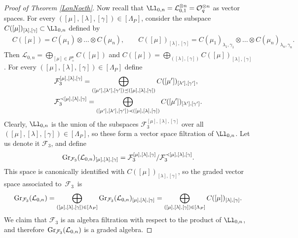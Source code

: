 \begin{proof}[Proof of Theorem \ref{LonNoeth}]
Now recall that $\Ll_{0,n} = {\mathcal L}_{0,1}^{\otimes n} = {\mathcal O}_q^{\otimes n}$ as vector spaces. For every $([\mu],[\lambda],[\gamma])\in[\Lambda_P]$, consider the subspace $C([\mu])_{[\lambda],[\gamma]}\subset \Ll_{0,n}$ defined by
\begin{align*}
&C([\mu]) =C(\mu_1)\otimes \dots \otimes C(\mu_n),\qquad
C([\mu])_{[\lambda],[\gamma]}=C(\mu_1)_{\lambda_1,\gamma_1}\otimes \dots \otimes C(\mu_n)_{\lambda_n,\gamma_n}.
\end{align*}
Then $ {\mathcal L}_{0,n}=\bigoplus_{[\mu]\in P_+^n} C({[\mu]})$ and $ C({[\mu]})=\bigoplus_{([\lambda],[\gamma])} C([\mu])_{[\lambda],[\gamma]}$. For every
$([\mu],[\lambda],[\gamma])\in [\Lambda_P]$ define
\begin{align}
&{\mathcal F}_3^{[\mu],[\lambda],[\gamma]} =\bigoplus_{([\mu'],[\lambda'],[\gamma'])\preceq ([\mu],[\lambda],[\gamma])} C([\mu'])_{[\lambda'],[\gamma']},\label{F2grad}\\
&{\mathcal F}_3^{\prec [\mu],[\lambda],[\gamma]} =\bigoplus_{([\mu'],[\lambda'],[\gamma'])\prec ([\mu],[\lambda],[\gamma])} C([\mu'])_{[\lambda'],[\gamma']}.\notag
\end{align}
Clearly, $\Ll_{0,n}$ is the union of the subspaces ${\mathcal F}_3^{[\mu],[\lambda],[\gamma]}$ over all $([\mu],[\lambda],[\gamma])\in [\Lambda_P]$, so these form a vector space filtration of $\Ll_{0,n}$. Let us denote it ${\mathcal F}_3$, and define
\[{\rm Gr}_{{\mathcal F}_3}({\mathcal L}_{0,n})_{[\mu],[\lambda],[\gamma]} = {\mathcal F}_3^{[\mu],[\lambda],[\gamma]}/{\mathcal F}_3^{\prec [\mu],[\lambda],[\gamma]}.\]
This space is canonically identified with $C({[\mu]})_{[\lambda],[\gamma]}$, so the graded vector space associated to~$\mathcal{F}_3$~is%
\begin{equation}\label{decompgrad}
{\rm Gr}_{{\mathcal F}_3}({\mathcal L}_{0,n}) = \bigoplus_{([\mu],[\lambda],[\gamma])\in [\Lambda_P]} {\rm Gr}_{{\mathcal F}_3}({\mathcal L}_{0,n})_{[\mu],[\lambda],[\gamma]} = \bigoplus_{([\mu],[\lambda],[\gamma])\in [\Lambda_P]} C({[\mu]})_{[\lambda],[\gamma]}.
\end{equation}
 We claim that ${\mathcal F}_3$ is an algebra filtration with respect to the product of $\Ll_{0,n}$, and therefore~${{\rm Gr}_{{\mathcal F}_3}({\mathcal L}_{0,n})}$ is a graded algebra.


\end{proof}
